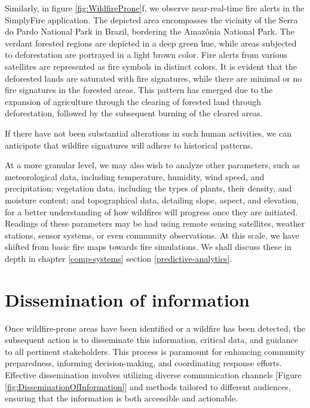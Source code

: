 \documentclass[
  12 pt,
]{Nemilov}
\begin{document}
Similarly, in figure \ref{fig:WildfireProne}f, we observe near-real-time fire alerts in the SimplyFire application. The depicted area encompasses the vicinity of the Serra do Pardo National Park in Brazil, bordering the Amazônia National Park. The verdant forested regions are depicted in a deep green hue, while areas subjected to deforestation are portrayed in a light brown color. Fire alerts from various satellites are represented as fire symbols in distinct colors. It is evident that the deforested lands are saturated with fire signatures, while there are minimal or no fire signatures in the forested areas. This pattern has emerged due to the expansion of agriculture through the clearing of forested land through deforestation, followed by the subsequent burning of the cleared areas.

If there have not been substantial alterations in such human activities, we can anticipate that wildfire signatures will adhere to historical patterns.

At a more granular level, we may also wish to analyze other parameters, such as meteorological data, including temperature, humidity, wind speed, and precipitation; vegetation data, including the types of plants, their density, and moisture content; and topographical data, detailing slope, aspect, and elevation, for a better understanding of how wildfires will progress once they are initiated. Readings of these parameters may be had using remote sensing satellites, weather stations, sensor systems, or even community observations. At this scale, we have shifted from basic fire maps towards fire simulations. We shall discuss these in depth in chapter \ref{comp-systems} section \ref{predictive-analytics}.

\section{Dissemination of information}\label{dissemination-of-information}

Once wildfire-prone areas have been identified or a wildfire has been detected, the subsequent action is to disseminate this information, critical data, and guidance to all pertinent stakeholders. This process is paramount for enhancing community preparedness, informing decision-making, and coordinating response efforts. Effective dissemination involves utilizing diverse communication channels {[}Figure \ref{fig:DisseminationOfInformation}{]} and methods tailored to different audiences, ensuring that the information is both accessible and actionable.
\end{document}
